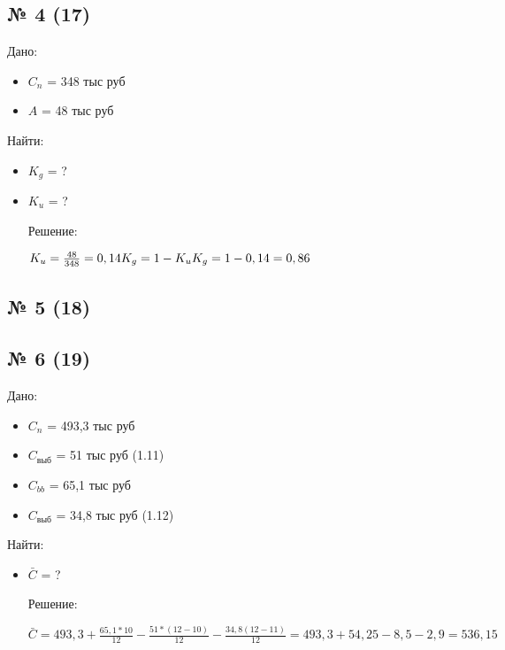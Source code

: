 \documentclass[11pt]{article}
\begin{document}
\subsection{№ 4 (17)}
\label{sec:org9eb055e}

Дано:
\begin{itemize}
\item \(C_{n}\) = 348 тыс руб
\item \(A\) = 48 тыс руб
\end{itemize}
Найти:

\begin{itemize}
\item \(K_{g}\) = ?
\item \(K_{u}\) = ?

Решение:

\begin{math}
K_{u} = \frac{48}{348} = 0,14 \\
K_{g} = 1 - K_{u} \\
K_{g} = 1 - 0,14 = 0,86
\end{math}
\end{itemize}



\subsection{№ 5 (18)}
\label{sec:org563f3a4}


\subsection{№ 6 (19)}
\label{sec:org3da8f86}

Дано:
\begin{itemize}
\item \(C_{n}\) = 493,3 тыс руб
\item \(C_{\text{выб}}\) = 51 тыс руб (1.11)
\item \(C_{bb}\) = 65,1 тыс руб
\item \(C_{\text{выб}}\) = 34,8 тыс руб (1.12)
\end{itemize}

Найти:

\begin{itemize}
\item \(\bar{C}\) = ?

Решение:

\begin{math}
\bar{C} = 493,3 + \frac{65,1*10}{12} - \frac{51*(12-10)}{12} - \frac{34,8(12-11)}{12} = 493,3 + 54,25 - 8,5 - 2,9 = 536,15
 \end{math}
\end{itemize}
\end{document}

